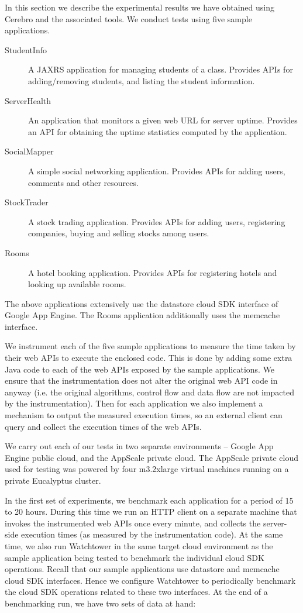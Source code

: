 In this section we describe the experimental results we have obtained using Cerebro and the associated tools. We conduct
tests using five sample applications. 

\begin{description}
\item[StudentInfo] A JAXRS application for managing students of a class. Provides APIs for
adding/removing students, and listing the student information.
\item[ServerHealth] An application that monitors a given web URL for server uptime. Provides an
API for obtaining the uptime statistics computed by the application.
\item[SocialMapper] A simple social networking application. Provides APIs for adding users,
comments and other resources.
\item[StockTrader] A stock trading application. Provides APIs for adding users, registering
companies, buying and selling stocks among users.
\item[Rooms] A hotel booking application. Provides APIs for registering hotels and looking up
available rooms.
\end{description}

The above applications extensively use the datastore cloud SDK interface of Google App Engine. The Rooms application
additionally uses the memcache interface.

We instrument each of the five sample applications to measure the time taken by their web APIs to execute the
enclosed code. This is done by adding some extra Java code to each of the web APIs exposed by the sample applications.
We ensure that the instrumentation does not alter the original web API code in anyway (i.e. the original algorithms, control flow
and data flow are not impacted by the instrumentation). Then for each application we also
implement a mechanism to output the measured execution times, so an external client can query and collect the execution
times of the web APIs.

We carry out each of our tests in two separate environments -- Google App Engine public cloud, and
the AppScale private cloud. The AppScale private cloud used for testing was powered by four m3.2xlarge virtual machines 
running on a private Eucalyptus cluster.

In the first set of experiments, we benchmark each application for a period of 15 to 20 hours.
During this time we run an HTTP client on a separate machine that invokes the instrumented web APIs once every minute, 
and collects the server-side execution times (as measured by the instrumentation code).
At the same time, we also run Watchtower in the same target cloud environment as the sample application being tested to
benchmark the individual cloud SDK operations. Recall that our sample applications use datastore and memcache
cloud SDK interfaces. Hence
we configure Watchtower to periodically benchmark the cloud SDK operations related to these two interfaces. 
At the end of a benchmarking run, we have two sets of data at hand:

